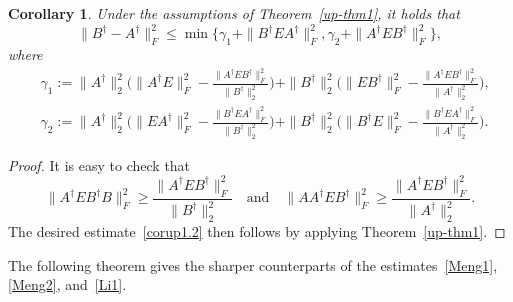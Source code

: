 \documentclass[11pt]{article}
\newtheorem{corollary}{Corollary}[section]
\begin{document}
\begin{corollary}\label{corup2}
Under the assumptions of Theorem~\ref{up-thm1}, it holds that
\begin{equation}\label{corup1.2}
\|B^{\dagger}-A^{\dagger}\|_{F}^{2}\leq\min\big\{\gamma_{1}+\|B^{\dagger}EA^{\dagger}\|_{F}^{2}, \gamma_{2}+\|A^{\dagger}EB^{\dagger}\|_{F}^{2}\big\},
\end{equation}
where
\begin{align*}
&\gamma_{1}:=\|A^{\dagger}\|_{2}^{2}\bigg(\|A^{\dagger}E\|_{F}^{2}-\frac{\|A^{\dagger}EB^{\dagger}\|_{F}^{2}}{\|B^{\dagger}\|_{2}^{2}}\bigg)+\|B^{\dagger}\|_{2}^{2}\bigg(\|EB^{\dagger}\|_{F}^{2}-\frac{\|A^{\dagger}EB^{\dagger}\|_{F}^{2}}{\|A^{\dagger}\|_{2}^{2}}\bigg),\\
&\gamma_{2}:=\|A^{\dagger}\|_{2}^{2}\bigg(\|EA^{\dagger}\|_{F}^{2}-\frac{\|B^{\dagger}EA^{\dagger}\|_{F}^{2}}{\|B^{\dagger}\|_{2}^{2}}\bigg)+\|B^{\dagger}\|_{2}^{2}\bigg(\|B^{\dagger}E\|_{F}^{2}-\frac{\|B^{\dagger}EA^{\dagger}\|_{F}^{2}}{\|A^{\dagger}\|_{2}^{2}}\bigg).
\end{align*}
\end{corollary}

\begin{proof}
It is easy to check that
\begin{displaymath}
\|A^{\dagger}EB^{\dagger}B\|_{F}^{2}\geq\frac{\|A^{\dagger}EB^{\dagger}\|_{F}^{2}}{\|B^{\dagger}\|_{2}^{2}} \quad \text{and} \quad \|AA^{\dagger}EB^{\dagger}\|_{F}^{2}\geq\frac{\|A^{\dagger}EB^{\dagger}\|_{F}^{2}}{\|A^{\dagger}\|_{2}^{2}}.
\end{displaymath}
The desired estimate~\eqref{corup1.2} then follows by applying Theorem~\ref{up-thm1}.
\end{proof}

The following theorem gives the sharper counterparts of the estimates~\eqref{Meng1}, \eqref{Meng2}, and~\eqref{Li1}.
\end{document}
